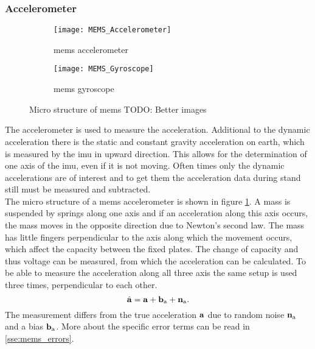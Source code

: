 \subsubsection{ Accelerometer}
\begin{figure}[htb]
	\centering
	\begin{subfigure}{0.48\textwidth}
		\centering
		\texttt{[image: MEMS\_Accelerometer]}
		\caption{\acrshort{mems} accelerometer}
		\label{fig:MEMS_Accelerometer}
	\end{subfigure}
	\begin{subfigure}{0.48\textwidth}
		\centering
		\texttt{[image: MEMS\_Gyroscope]}
		\caption{\acrshort{mems} gyroscope}
		\label{fig:MEMS_Gyroscope}
	\end{subfigure}
	\caption{Micro structure of \acrshort{mems} TODO: Better images}
	\label{fig:MEMS_design}
\end{figure}
The accelerometer is used to measure the acceleration.
Additional to the dynamic acceleration there is the static and constant gravity acceleration on earth, which is measured by the \gls{imu} in upward direction.
This allows for the determination of one axis of the \gls{imu}, even if it is not moving.
Often times only the dynamic accelerations are of interest and to get them the acceleration data during stand still must be measured and subtracted.\\
The micro structure of a \gls{mems} accelerometer is shown in figure \ref{fig:MEMS_Accelerometer}.
A mass is suspended by springs along one axis and if an acceleration along this axis occurs, the mass moves in the opposite direction due to Newton's second law.
The mass has little fingers perpendicular to the axis along which the movement occurs, which affect the capacity between the fixed plates.
The change of capacity and thus voltage can be measured, from which the acceleration can be calculated.
To be able to measure the acceleration along all three axis the same setup is used three times, perpendicular to each other.\\
\begin{equation}
	\hat{\vb{a}} = \vb{a} + \vb{b}_\mathrm{a} + \vb{n}_\mathrm{a}.
\end{equation}
The measurement differs from the true acceleration $\vb{a}$ due to random noise $\vb{n}_\mathrm{a}$ and a bias $\vb{b}_\mathrm{a}$.
More about the specific error terms can be read in \ref{sse:mems_errors}.

